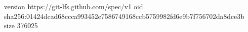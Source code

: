 version https://git-lfs.github.com/spec/v1
oid sha256:01424dcad68ccca993452c7586749168ccb5759982fd6e9b7f756702da8dce3b
size 376025
